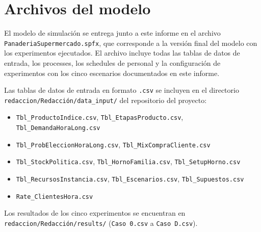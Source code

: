\documentclass[12pt]{article}
\begin{document}
\newpage
\section{Archivos del modelo}

El modelo de simulación se entrega junto a este informe en el archivo \texttt{PanaderiaSupermercado.spfx}, que corresponde a la versión final del modelo con los experimentos ejecutados. El archivo incluye todas las tablas de datos de entrada, los processes, los schedules de personal y la configuración de experimentos con los cinco escenarios documentados en este informe.

Las tablas de datos de entrada en formato \texttt{.csv} se incluyen en el directorio \texttt{redaccion/Redacción/data\_input/} del repositorio del proyecto:
\begin{itemize}
  \item \texttt{Tbl\_ProductoIndice.csv}, \texttt{Tbl\_EtapasProducto.csv}, \texttt{Tbl\_DemandaHoraLong.csv}
  \item \texttt{Tbl\_ProbEleccionHoraLong.csv}, \texttt{Tbl\_MixCompraCliente.csv}
  \item \texttt{Tbl\_StockPolitica.csv}, \texttt{Tbl\_HornoFamilia.csv}, \texttt{Tbl\_SetupHorno.csv}
  \item \texttt{Tbl\_RecursosInstancia.csv}, \texttt{Tbl\_Escenarios.csv}, \texttt{Tbl\_Supuestos.csv}
  \item \texttt{Rate\_ClientesHora.csv}
\end{itemize}

Los resultados de los cinco experimentos se encuentran en \texttt{redaccion/Redacción/results/} (\texttt{Caso~0.csv} a \texttt{Caso~D.csv}).
\end{document}
